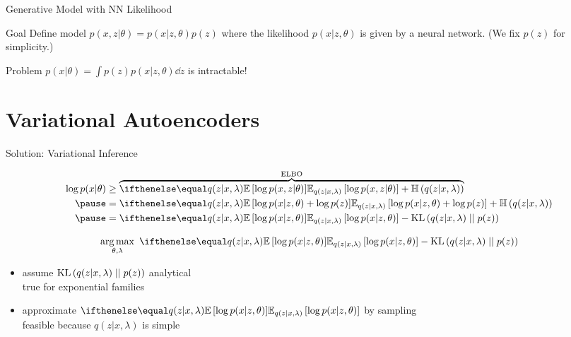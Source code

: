 \begin{frame}{Generative Model with NN Likelihood}
\begin{block}{Goal}
Define model $ p(x,z|\theta) = p(x|z,\theta)p(z) $ where the likelihood $ p(x|z,\theta) $ is given by a neural
network. (We fix $ p(z) $ for simplicity.)
\end{block}

\begin{block}{Problem}
$ p(x|\theta) = \int p(z) p(x|z,\theta)  \dd z $ is intractable!
\end{block}
\end{frame}



\section{Variational Autoencoders}
\frame{\tableofcontents[currentsection]}

\begin{frame}{Solution: Variational Inference}

\vspace{-10pt}
\begin{small}
\begin{equation*}
\begin{aligned}
\log p(x|\theta) &\geq \overbrace{\E[q(z|x, \lambda)]{\log p(x,z|\theta)} + \Ent{q(z|x, \lambda)}}^{\ELBO} \\ 
\pause
&= \E[q(z|x, \lambda)]{\log p(x|z, \theta) + \log p(z)} + \Ent{q(z|x, \lambda)} \\ \pause
&= \E[q(z|x, \lambda)]{\log p(x|z, \theta)} - \KL{q(z|x, \lambda)}{p(z)}
\end{aligned}
\end{equation*}
\end{small}

\pause

\vspace{-20pt}
\begin{equation*}
\argmax_{\theta,\lambda} ~ \E[q(z|x, \lambda)]{\log p(x|z, \theta)} - \KL{q(z|x, \lambda)}{p(z)}
\end{equation*}


\pause

\begin{itemize}
	\item assume $\operatorname{KL}\left(q(z|x, \lambda)\mid\mid p(z)\right)$  analytical\\
	true for exponential families \pause
	\item approximate $\E[q(z|x, \lambda)]{\log p(x|z, \theta)}$ by sampling\\
	feasible because  $q(z|x, \lambda)$ is simple
\end{itemize}


\end{frame}

